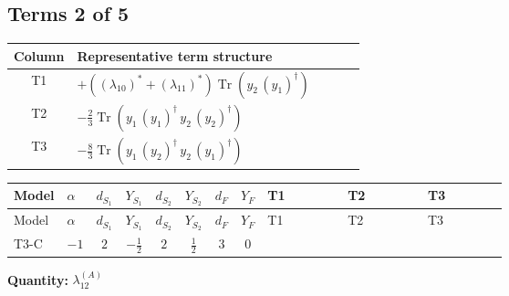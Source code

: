 \documentclass[8pt]{article}
\begin{document}
\begin{landscape}
\subsection*{Terms 2 of 5}
\begin{center}
\begin{tabular}{@{}c >{\raggedright\arraybackslash}p{0.82\linewidth}@{}}
\toprule
Column & Representative term structure \\
\midrule
T1 & \(\displaystyle +(\left({\lambda_{10}}\right)^{*}+\left({\lambda_{11}}\right)^{*}) \operatorname{Tr}\!\left({y_2}\,\left({y_1}\right)^{\dagger}\right)\) \\
\midrule
T2 & \(\displaystyle -\frac{2}{3} \operatorname{Tr}\!\left({y_1}\,\left({y_1}\right)^{\dagger}\,{y_2}\,\left({y_2}\right)^{\dagger}\right)\) \\
\midrule
T3 & \(\displaystyle -\frac{8}{3} \operatorname{Tr}\!\left({y_1}\,\left({y_2}\right)^{\dagger}\,{y_2}\,\left({y_1}\right)^{\dagger}\right)\) \\
\midrule
\bottomrule
\end{tabular}
\end{center}
\smallskip
\tiny
\begin{longtable}{@{}llcccccc >{\raggedright\arraybackslash}p{0.21\linewidth} >{\raggedright\arraybackslash}p{0.21\linewidth} >{\raggedright\arraybackslash}p{0.21\linewidth}@{}}
\toprule
Model & $\alpha$ & $d_{S_1}$ & $Y_{S_1}$ & $d_{S_2}$ & $Y_{S_2}$ & $d_F$ & $Y_F$ & T1 & T2 & T3 \\
\midrule
\endfirsthead
\toprule
Model & $\alpha$ & $d_{S_1}$ & $Y_{S_1}$ & $d_{S_2}$ & $Y_{S_2}$ & $d_F$ & $Y_F$ & T1 & T2 & T3 \\
\midrule
\endhead
T3-C & $-1$ & $2$ & $-\frac{1}{2}$ & $2$ & $\frac{1}{2}$ & $3$ & $0$ & \scriptsize\adjustbox{max width=\linewidth}{$\begin{gathered} +(\left({\lambda_{10}}\right)^{*}+\left({\lambda_{11}}\right)^{*}) \operatorname{Tr}\!\left({y_2}\,\left({y_1}\right)^{\dagger}\right)\end{gathered}$} & \scriptsize\adjustbox{max width=\linewidth}{$\begin{gathered} -\frac{2}{3} \operatorname{Tr}\!\left({y_1}\,\left({y_1}\right)^{\dagger}\,{y_2}\,\left({y_2}\right)^{\dagger}\right)\end{gathered}$} & \scriptsize\adjustbox{max width=\linewidth}{$\begin{gathered} -\frac{8}{3} \operatorname{Tr}\!\left({y_1}\,\left({y_2}\right)^{\dagger}\,{y_2}\,\left({y_1}\right)^{\dagger}\right)\end{gathered}$} \\
\midrule
\bottomrule
\end{longtable}
\clearpage
\noindent\textbf{Quantity: }$\lambda_{12}^{(A)}$\par\smallskip

\end{landscape}
\end{document}
